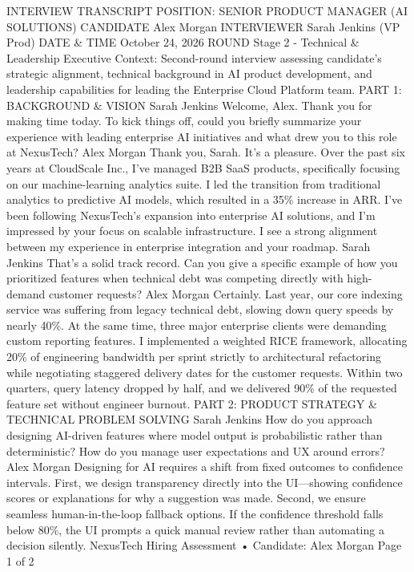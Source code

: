 INTERVIEW TRANSCRIPT
POSITION: SENIOR PRODUCT MANAGER (AI SOLUTIONS)
CANDIDATE
Alex Morgan
INTERVIEWER
Sarah Jenkins (VP Prod)
DATE \& TIME
October 24, 2026
ROUND
Stage 2 - Technical \&
Leadership
Executive Context: Second-round interview assessing candidate's strategic alignment, technical background in
AI product development, and leadership capabilities for leading the Enterprise Cloud Platform team.
PART 1: BACKGROUND \& VISION
Sarah Jenkins
Welcome, Alex. Thank you for making time today. To kick things off, could you briefly summarize your experience
with leading enterprise AI initiatives and what drew you to this role at NexusTech?
Alex Morgan
Thank you, Sarah. It’s a pleasure. Over the past six years at CloudScale Inc., I’ve managed B2B SaaS products,
specifically focusing on our machine-learning analytics suite. I led the transition from traditional analytics to
predictive AI models, which resulted in a 35\% increase in ARR. I’ve been following NexusTech’s expansion into
enterprise AI solutions, and I’m impressed by your focus on scalable infrastructure. I see a strong alignment between
my experience in enterprise integration and your roadmap.
Sarah Jenkins
That’s a solid track record. Can you give a specific example of how you prioritized features when technical debt was
competing directly with high-demand customer requests?
Alex Morgan
Certainly. Last year, our core indexing service was suffering from legacy technical debt, slowing down query speeds
by nearly 40\%. At the same time, three major enterprise clients were demanding custom reporting features. I
implemented a weighted RICE framework, allocating 20\% of engineering bandwidth per sprint strictly to architectural
refactoring while negotiating staggered delivery dates for the customer requests. Within two quarters, query latency
dropped by half, and we delivered 90\% of the requested feature set without engineer burnout.
PART 2: PRODUCT STRATEGY \& TECHNICAL PROBLEM SOLVING
Sarah Jenkins
How do you approach designing AI-driven features where model output is probabilistic rather than deterministic?
How do you manage user expectations and UX around errors?
Alex Morgan
Designing for AI requires a shift from fixed outcomes to confidence intervals. First, we design transparency directly
into the UI—showing confidence scores or explanations for why a suggestion was made. Second, we ensure
seamless human-in-the-loop fallback options. If the confidence threshold falls below 80\%, the UI prompts a quick
manual review rather than automating a decision silently.
NexusTech Hiring Assessment • Candidate: Alex Morgan
Page 1 of 2

